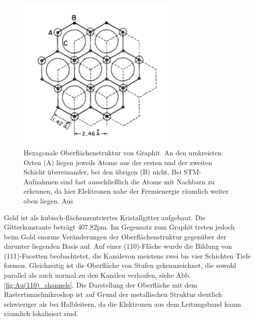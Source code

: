 \begin{figure}
    \includegraphics[width=0.7\textwidth]{pics/graphite}
    \caption{Hexagonale Oberflächenstruktur von Graphit. An den umkreisten Orten (A) 
liegen jeweils Atome aus der ersten und der zweiten Schicht übereinander, bei den 
übrigen (B) nicht. Bei STM-Aufnahmen sind fast ausschließlich die Atome mit Nachbarn 
zu erkennen, da hier Elektronen nahe der Fermienergie räumlich weiter oben liegen. 
Aus \cite{park1986tunneling}}
    \label{fig:graphite}
\end{figure} 

Gold ist als kubisch-flächenzentriertes Kristallgitter aufgebaut. Die Gitterkonstante 
beträgt $407.82\mathrm{pm}$\cite{ohring1995engineering}. Im Gegensatz zum Graphit 
treten jedoch beim Gold enorme Veränderungen der Oberflächenstruktur gegenüber der 
darunter liegenden Basis auf. Auf einer (110)-Fläche wurde die Bildung von 
(111)-Facetten beobachtetet, die Kanälevon meistens zwei bis vier Schichten Tiefe 
formen. Gleichzeitig ist die Oberfläche von Stufen gekennzeichnet, die sowohl parallel 
als auch normal zu den Kanälen verlaufen, siehe Abb. \ref{fig:Au(110)_channels}. Die Darstellung 
der Oberfläche mit dem Rastertunnelmikroskop ist auf Grund der metallischen Struktur 
deutlich schwieriger als bei Halbleitern, da die Elektronen aus dem Leitungsband kaum 
räumlich lokalisiert sind. 

